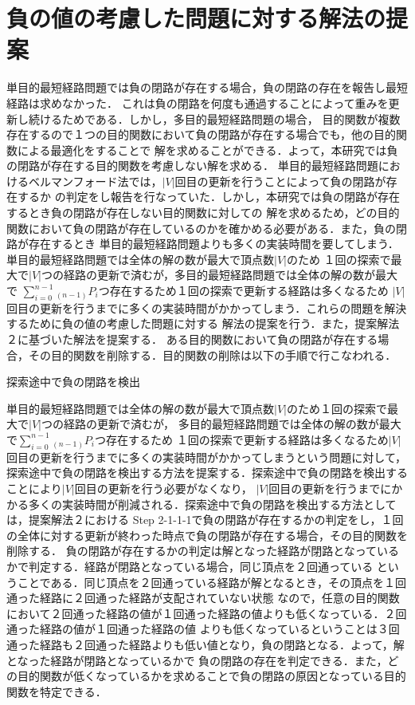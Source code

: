 \documentclass[12pt]{optlab-bachelor}
\begin{document}
\section{負の値の考慮した問題に対する解法の提案}

単目的最短経路問題では負の閉路が存在する場合，負の閉路の存在を報告し最短経路は求めなかった．
これは負の閉路を何度も通過することによって重みを更新し続けるためである．しかし，多目的最短経路問題の場合，
目的関数が複数存在するので１つの目的関数において負の閉路が存在する場合でも，他の目的関数による最適化をすることで
解を求めることができる．よって，本研究では負の閉路が存在する目的関数を考慮しない解を求める．
単目的最短経路問題におけるベルマンフォード法では，$|V|$回目の更新を行うことによって負の閉路が存在するか
の判定をし報告を行なっていた．しかし，本研究では負の閉路が存在するとき負の閉路が存在しない目的関数に対しての
解を求めるため，どの目的関数において負の閉路が存在しているのかを確かめる必要がある．また，負の閉路が存在するとき
単目的最短経路問題よりも多くの実装時間を要してしまう．単目的最短経路問題では全体の解の数が最大で頂点数$|V|$のため
１回の探索で最大で$|V|$つの経路の更新で済むが，多目的最短経路問題では全体の解の数が最大で
$\displaystyle \sum_{i=0}^{n-1} {}_{(n-1)}P_i$つ存在するため１回の探索で更新する経路は多くなるため
$|V|$回目の更新を行うまでに多くの実装時間がかかってしまう．これらの問題を解決するために負の値の考慮した問題に対する
解法の提案を行う．また，提案解法２に基づいた解法を提案する．
ある目的関数において負の閉路が存在する場合，その目的関数を削除する．目的関数の削除は以下の手順で行こなわれる．

\begin{description}
  \item[探索途中で負の閉路を検出]
\end{description}

単目的最短経路問題では全体の解の数が最大で頂点数$|V|$のため１回の探索で最大で$|V|$つの経路の更新で済むが，
多目的最短経路問題では全体の解の数が最大で$\displaystyle \sum_{i=0}^{n-1} {}_{(n-1)}P_i$つ存在するため
１回の探索で更新する経路は多くなるため$|V|$回目の更新を行うまでに多くの実装時間がかかってしまうという問題に対して，
探索途中で負の閉路を検出する方法を提案する．探索途中で負の閉路を検出することにより$|V|$回目の更新を行う必要がなくなり，
$|V|$回目の更新を行うまでにかかる多くの実装時間が削減される．探索途中で負の閉路を検出する方法としては，提案解法２における
Step 2-1-1-1で負の閉路が存在するかの判定をし，１回の全体に対する更新が終わった時点で負の閉路が存在する場合，その目的関数を削除する．
負の閉路が存在するかの判定は解となった経路が閉路となっているかで判定する．経路が閉路となっている場合，同じ頂点を２回通っている
ということである．同じ頂点を２回通っている経路が解となるとき，その頂点を１回通った経路に２回通った経路が支配されていない状態
なので，任意の目的関数において２回通った経路の値が１回通った経路の値よりも低くなっている．２回通った経路の値が１回通った経路の値
よりも低くなっているということは３回通った経路も２回通った経路よりも低い値となり，負の閉路となる．よって，解となった経路が閉路となっているかで
負の閉路の存在を判定できる．また，どの目的関数が低くなっているかを求めることで負の閉路の原因となっている目的関数を特定できる．
\end{document}

